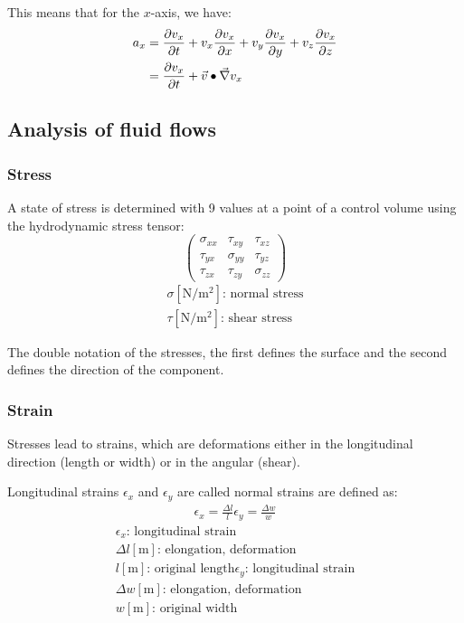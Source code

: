 \documentclass[10pt, twocolumn]{article}
\begin{document}
This means that for the \(x\)-axis, we have:
\begin{align*}
  a_x & = \frac{\partial v_x}{\partial t} + v_x \frac{\partial v_x}{\partial x} + v_y \frac{\partial v_x}{\partial y} + v_z \frac{\partial v_x}{\partial z} \\
      & = \frac{\partial v_x}{\partial t} + \vec{v} \bullet \vec{\nabla}v_x
\end{align*}


\subsection{Analysis of fluid flows}
\subsubsection{Stress}
A state of stress is determined with 9 values at a point of a control volume using the hydrodynamic stress tensor:
\[
  \begin{pmatrix}
    \sigma_{xx} & \tau_{xy}   & \tau_{xz}   \\
    \tau_{yx}   & \sigma_{yy} & \tau_{yz}   \\
    \tau_{zx}   & \tau_{zy}   & \sigma_{zz}
  \end{pmatrix}
\]
\[
  \begin{array}{|l}
    \sigma [\si{\newton\per\metre\squared}] \text{: normal stress} \\
    \tau [\si{\newton\per\metre\squared}] \text{: shear stress}
  \end{array}
\]

The double notation of the stresses, the first defines the surface and the second defines the direction of the component.


\subsubsection{Strain}
Stresses lead to strains, which are deformations either in the longitudinal direction (length or width) or in the angular (shear).

Longitudinal strains \(\epsilon_x\) and \(\epsilon_y\) are called normal strains are defined as:
\begin{align*}
  \epsilon_x = \frac{\Delta l}{l}
  \epsilon_y = \frac{\Delta w}{w}
\end{align*}
\[
  \begin{array}{|l}
    \epsilon_x \text{: longitudinal strain}                 \\
    \Delta l [\si{\metre}] \text{: elongation, deformation} \\
    l [\si{\metre}] \text{: original length}
    \epsilon_y \text{: longitudinal strain}                 \\
    \Delta w [\si{\metre}] \text{: elongation, deformation} \\
    w [\si{\metre}] \text{: original width}
  \end{array}
\]
\end{document}
